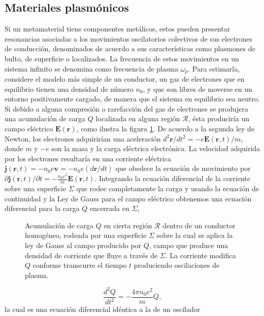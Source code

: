 \documentclass[12pt]{article}
\begin{document}
\subsection{Materiales plasmónicos}
Si un metamaterial tiene componentes metálicos, estos
pueden presentar resonancias asociadas a los movimientos oscilatorios
colectivos de sus electrones de conducción, denominados de acuerdo a sus
características como plasmones de bulto, de superficie o
localizados. La frecuencia de estos movimientos en un sistema infinito se
denomina como
frecuencia de plasma $\omega_{p}$. Para estimarla,
considere el modelo más simple de un conductor, un gas de electrones
que en equilibrio tienen una densidad de número $n_{0}$, y que son libres de
moverse en un entorno positivamente cargado, de manera que el sistema
en equilibrio sea neutro. Si debido a alguna compresión o rarefacción
del gas de electrones se produjera una acumulación de carga $Q$
localizada en alguna región $\mathcal{R}$, ésta produciría un campo
eléctrico $\bm{E} (\bm{r})$, como ilustra la figura
\ref{Bulkplasmon}. De acuerdo a la segunda ley de Newton, los
electrones adquirirían una aceleración
$d^{2}\bm{r}/dt^{2} = -e\bm{E}(\bm{r},t)/m$, donde $m$ y $-e$
son la masa y la carga eléctrica electrónica. La velocidad adquirida
por los electrones resultaría en una corriente eléctrica
$\bm{j}(\bm{r},t) = -n_0 e \bm v=-n_{0}e({d\bm{r}}/{dt})$ que obedece
la ecuación de movimiento por
${\partial \bm{j}(\bm{r},t)}/{\partial t}=
-\frac{n_{0}e^{2}}{m}\bm{E}(\bm{r},t)$. Integrando la ecuación
diferencial de la corriente sobre una superficie $\Sigma$ que rodee
completamente la carga y usando la ecuación de continuidad y la Ley de
Gauss para el campo eléctrico obtenemos una ecuación diferencial para
la carga $Q$ encerrada en $\Sigma$,
\begin{figure}
\centering

\caption{Acumulación de carga $Q$ en cierta región $\mathcal{R}$
  dentro de un conductor homogéneo, rodeada por una superficie
  $\Sigma$ sobre la cual se aplica la ley de Gauss al campo producido
  por $Q$, campo que produce una densidad de corriente que fluye a
  través de $\Sigma$. La corriente modifica $Q$ conforme transcurre el
  tiempo $t$ produciendo oscilaciones de plasma.}
\label{Bulkplasmon}
\end{figure}
\begin{equation}
  \label{ChargeDifEq}
  \frac{d^{2}Q}{dt^{2}}=-\frac{4\pi n_0 e^{2}}{m}Q,
\end{equation}
la cual es una ecuación diferencial idéntica a la de un oscilador
\end{document}
